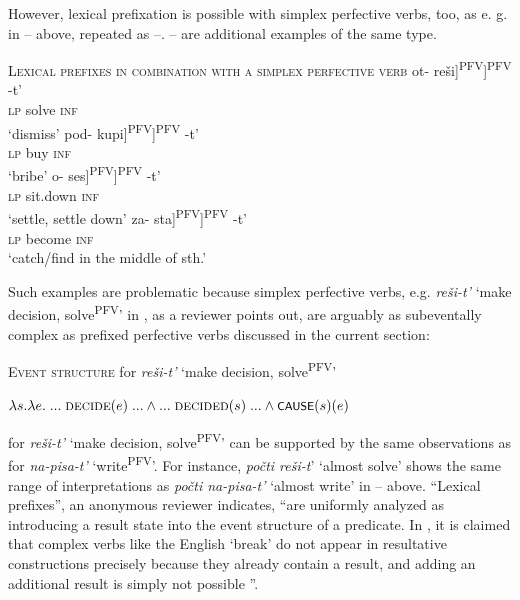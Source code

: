 \documentclass[output=paper,colorlinks,citecolor=brown]{langscibook}
\begin{document}
However, lexical prefixation is possible with simplex perfective verbs, too, as e. g. in -- above, repeated as --. -- are additional examples of the same type.

\ea   \textsc{Lexical prefixes in combination with a simplex perfective verb}\label{tat:ex:51}
\ea \gll \minsp{[} ot- \minsp{[} reši]\textsuperscript{PFV}]\textsuperscript{PFV} -t’  \\
{} \textsc{lp} {} solve \textsc{inf}\\
\glt  ‘dismiss’  \label{ex:tatevosov:51a}
\ex  \gll \minsp{[} pod- \minsp{[} kupi]\textsuperscript{PFV}]\textsuperscript{PFV}{} -t’  \\  
{} \textsc{lp} {} buy \textsc{inf}\\
\glt  ‘bribe’ \label{ex:tatevosov:51b}
\ex \gll \minsp{[} o- \minsp{[} ses]\textsuperscript{PFV}]\textsuperscript{PFV} -t’\\
{} \textsc{lp} {} sit.down \textsc{inf}\\
\glt ‘settle, settle down’\label{ex:tatevosov:51c}
\ex \gll \minsp{[} za- \minsp{[} sta]\textsuperscript{PFV}]\textsuperscript{PFV} -t’\\
    {} \textsc{lp} {} become \textsc{inf}\\
\glt  ‘catch/find in the middle of sth.’\label{ex:tatevosov:51d}
\z
\z

\noindent Such examples are problematic because simplex perfective verbs, e.g. \textit{reši-t’} ‘make decision, solve\textsuperscript{PFV}’ in , as a reviewer points out, are arguably as subeventally complex as prefixed perfective verbs discussed in the current section:

\ea   \textsc{Event structure} for \textit{reši-t’} ‘make decision, solve\textsuperscript{PFV}’

$\lambda s. \lambda e.\; ...\; \textsc{decide}(e)\; ... \wedge ...\; \textsc{decided}(s)\; ... \wedge \cnst{cause}(s)(e)$ \label{tat:ex:52}
\z

\noindent {} for \textit{reši-t’} ‘make decision, solve\textsuperscript{PFV}’ can be supported by the same observations as  for \textit{na-pisa-t’} ‘write\textsuperscript{PFV}’. For instance, \textit{počti reši-t}’ ‘almost solve’ shows the same range of interpretations as \textit{počti na-pisa-t’} ‘almost write’ in -- above. “Lexical prefixes”, an anonymous reviewer indicates, “are uniformly analyzed as introducing a result state into the event structure of a predicate. In \citet{Rappaport.Hovav.Levin1998}, it is claimed that complex verbs like the English ‘break’ do not appear in resultative constructions precisely because they already contain a result, and adding an additional result is simply not possible \citep[][103]{Rappaport.Hovav.Levin1998}”.
\end{document}
